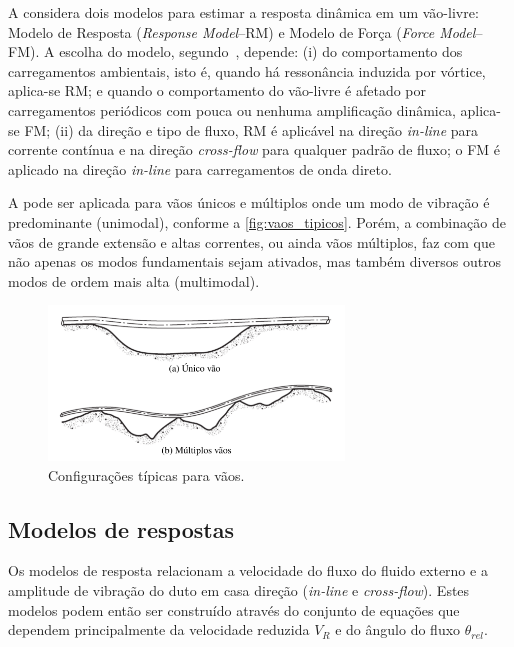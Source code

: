 A  considera dois modelos para estimar a resposta dinâmica em um vão-livre: Modelo de Resposta (\textit{Response Model}--RM) e Modelo de Força (\textit{Force Model}--FM).
A escolha do modelo, segundo~, depende: (i) do comportamento dos carregamentos ambientais, isto é, quando há ressonância induzida por vórtice, aplica-se RM\@; e quando o comportamento do vão-livre é afetado por carregamentos periódicos com pouca ou nenhuma amplificação dinâmica, aplica-se FM\@; (ii) da direção e tipo de fluxo, RM é aplicável na direção \textit{in-line} para corrente contínua e na direção \textit{cross-flow} para qualquer padrão de fluxo; o FM é aplicado na direção \textit{in-line} para carregamentos de onda direto.

A  pode ser aplicada para vãos únicos e múltiplos onde um modo de vibração é predominante (unimodal), conforme a \autoref{fig:vaos_tipicos}.
Porém, a combinação de vãos de grande extensão e altas correntes, ou ainda vãos múltiplos, faz com que não apenas os modos fundamentais sejam ativados, mas também diversos outros modos de ordem mais alta (multimodal).

\begin{figure}[!ht]
	\centering
    \caption{Configurações típicas para vãos.}\label{fig:vaos_tipicos}
	\includegraphics[width=0.7\textwidth]{imagens/vaos_tipicos}
\end{figure}


\subsection{Modelos de respostas}

Os modelos de resposta relacionam a velocidade do fluxo do fluido externo e a amplitude de vibração do duto em casa direção (\textit{in-line} e \textit{cross-flow}). Estes modelos podem então ser construído através do conjunto de equações que dependem principalmente da velocidade reduzida $V_R$ e do ângulo do fluxo $\theta_\mathit{rel}$.

